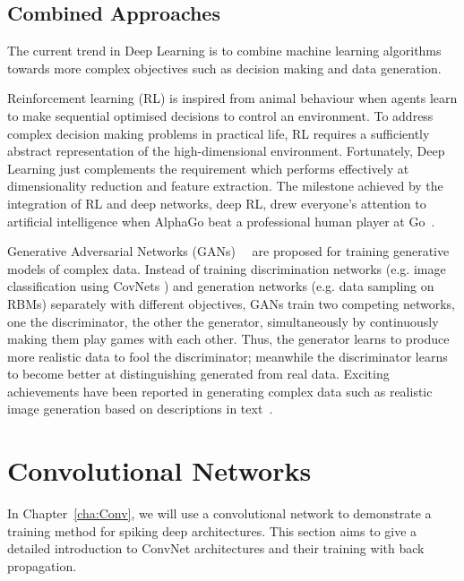 \subsection{Combined Approaches}
The current trend in Deep Learning is to combine machine learning algorithms towards more complex objectives such as decision making and data generation.

Reinforcement learning (RL) is inspired from animal behaviour when agents learn to make sequential optimised decisions to control an environment.
To address complex decision making problems in practical life, RL requires a sufficiently abstract representation of the high-dimensional environment.
Fortunately, Deep Learning just complements the requirement which performs effectively at dimensionality reduction and feature extraction.
The milestone achieved by the integration of RL and deep networks, deep RL, drew everyone's attention to artificial intelligence when AlphaGo beat a professional human player at Go~\citep{silver2016mastering}.

Generative Adversarial Networks (GANs)~~\citep{goodfellow2014generative} are proposed for training generative models of complex data.
Instead of training discrimination networks (e.g. image classification using CovNets ) and generation networks (e.g. data sampling on RBMs) separately with different objectives, GANs train two competing networks, one the discriminator, the other the generator, simultaneously by continuously making them play games with each other.
Thus, the generator learns to produce more realistic data to fool the discriminator; meanwhile the discriminator learns to become better at distinguishing generated from real data.
Exciting achievements have been reported in generating complex data such as realistic image generation based on descriptions in text~\citep{radford2015unsupervised}.

\section{Convolutional Networks}
\label{sec:convnet}
In Chapter~\ref{cha:Conv}, we will use a convolutional network to demonstrate a training method for spiking deep architectures.
This section aims to give a detailed introduction to ConvNet architectures and their training with back propagation.
